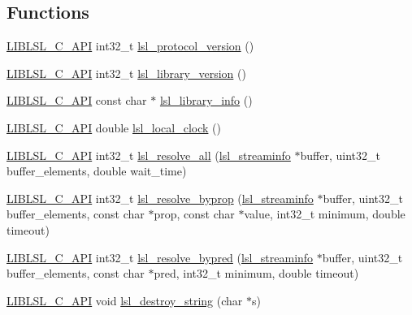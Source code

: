\subsection*{Functions}
\begin{DoxyCompactItemize}
\item 
\hyperlink{lsl__cpp_8h_aafd0ef1813e8be84a1420c4f1df64615}{L\+I\+B\+L\+S\+L\+\_\+\+C\+\_\+\+A\+PI} int32\+\_\+t \hyperlink{namespacelsl_a9695264d0e763474d352767702b38222}{lsl\+\_\+protocol\+\_\+version} ()
\item 
\hyperlink{lsl__cpp_8h_aafd0ef1813e8be84a1420c4f1df64615}{L\+I\+B\+L\+S\+L\+\_\+\+C\+\_\+\+A\+PI} int32\+\_\+t \hyperlink{namespacelsl_aa706e1332352902a9b531a88af671896}{lsl\+\_\+library\+\_\+version} ()
\item 
\hyperlink{lsl__cpp_8h_aafd0ef1813e8be84a1420c4f1df64615}{L\+I\+B\+L\+S\+L\+\_\+\+C\+\_\+\+A\+PI} const char $\ast$ \hyperlink{namespacelsl_a4e35f8426ffee9dbe7139dbe404e0442}{lsl\+\_\+library\+\_\+info} ()
\item 
\hyperlink{lsl__cpp_8h_aafd0ef1813e8be84a1420c4f1df64615}{L\+I\+B\+L\+S\+L\+\_\+\+C\+\_\+\+A\+PI} double \hyperlink{namespacelsl_a475274f88a060924c9bd1b38879ec63a}{lsl\+\_\+local\+\_\+clock} ()
\item 
\hyperlink{lsl__cpp_8h_aafd0ef1813e8be84a1420c4f1df64615}{L\+I\+B\+L\+S\+L\+\_\+\+C\+\_\+\+A\+PI} int32\+\_\+t \hyperlink{namespacelsl_a075ab08464c90d97b8f081d89ea889f2}{lsl\+\_\+resolve\+\_\+all} (\hyperlink{namespacelsl_aa0a9ce9956061679949daa2e35aae2e8}{lsl\+\_\+streaminfo} $\ast$buffer, uint32\+\_\+t buffer\+\_\+elements, double wait\+\_\+time)
\item 
\hyperlink{lsl__cpp_8h_aafd0ef1813e8be84a1420c4f1df64615}{L\+I\+B\+L\+S\+L\+\_\+\+C\+\_\+\+A\+PI} int32\+\_\+t \hyperlink{namespacelsl_a66563e2290de3b056a5480ced8596ec7}{lsl\+\_\+resolve\+\_\+byprop} (\hyperlink{namespacelsl_aa0a9ce9956061679949daa2e35aae2e8}{lsl\+\_\+streaminfo} $\ast$buffer, uint32\+\_\+t buffer\+\_\+elements, const char $\ast$prop, const char $\ast$value, int32\+\_\+t minimum, double timeout)
\item 
\hyperlink{lsl__cpp_8h_aafd0ef1813e8be84a1420c4f1df64615}{L\+I\+B\+L\+S\+L\+\_\+\+C\+\_\+\+A\+PI} int32\+\_\+t \hyperlink{namespacelsl_a11a5ef91d32961e0ad1d44dbef948399}{lsl\+\_\+resolve\+\_\+bypred} (\hyperlink{namespacelsl_aa0a9ce9956061679949daa2e35aae2e8}{lsl\+\_\+streaminfo} $\ast$buffer, uint32\+\_\+t buffer\+\_\+elements, const char $\ast$pred, int32\+\_\+t minimum, double timeout)
\item 
\hyperlink{lsl__cpp_8h_aafd0ef1813e8be84a1420c4f1df64615}{L\+I\+B\+L\+S\+L\+\_\+\+C\+\_\+\+A\+PI} void \hyperlink{namespacelsl_ac517533eaabb224fd2f893e1f4274d82}{lsl\+\_\+destroy\+\_\+string} (char $\ast$s)

\end{DoxyCompactItemize}
